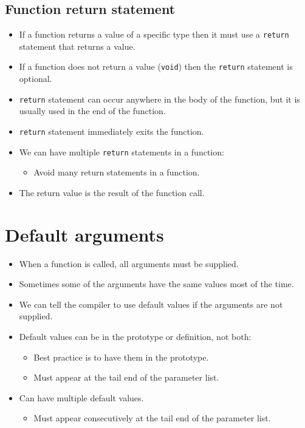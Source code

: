 \subsection{Function return statement}
\begin{itemize}
    \item If a function returns a value of a specific type then it must use a \texttt{return} statement that returns a value.
    \item If a function does not return a value (\texttt{void}) then the \texttt{return} statement is optional.
    \item \texttt{return} statement can occur anywhere in the body of the function, but it is usually used in the end of the function.
    \item \texttt{return} statement immediately exits the function.
    \item We can have multiple \texttt{return} statements in a function:
        \begin{itemize}
            \item Avoid many return statements in a function.
        \end{itemize}
    
    \item The return value is the result of the function call.
\end{itemize}


\section{Default arguments}
\begin{itemize}
    \item When a function is called, all arguments must be supplied.
    \item Sometimes some of the arguments have the same values most of the time.
    \item We can tell the compiler to use default values if the arguments are not supplied.
    \item Default values can be in the prototype or definition, not both:
        \begin{itemize}
            \item Best practice is to have them in the prototype.
            \item Must appear at the tail end of the parameter list.
        \end{itemize}
    
    \item Can have multiple default values.
        \begin{itemize}
            \item Must appear consecutively at the tail end of the parameter list. 
        \end{itemize}
\end{itemize}

